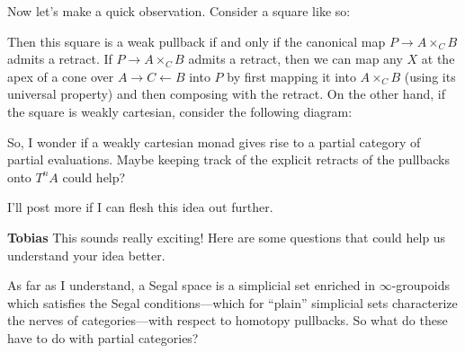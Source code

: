 \documentclass{amsart}
\newcommand{\respond}[1]{
  \vspace{1em} \textbf{#1}
}
\begin{document}
Now let's make a quick observation. Consider a square like so:
\begin{center}
\end{center}
Then this square is a weak pullback if and only if the canonical map $P \to A \times_C B$ admits a retract. If $P \to A \times_C B$ admits a retract, then we can map any $X$ at the apex of a cone over $A \to C \leftarrow B$ into $P$ by first mapping it into $A \times_C B$ (using its universal property) and then composing with the retract. On the other hand, if the square is weakly cartesian, consider the following diagram:
\begin{center}
\end{center}

So, I wonder if a weakly cartesian monad gives rise to a partial category of partial evaluations. Maybe keeping track of the explicit retracts of the pullbacks onto $T^nA$ could help?

I'll post more if I can flesh this idea out further.

\respond{Tobias} This sounds really exciting! Here are some questions that could help us understand your idea better.

As far as I understand, a Segal space is a simplicial set enriched in $\infty$-groupoids which satisfies the Segal conditions---which for ``plain'' simplicial sets characterize the nerves of categories---with respect to homotopy pullbacks. So what do these have to do with partial categories?
\end{document}
